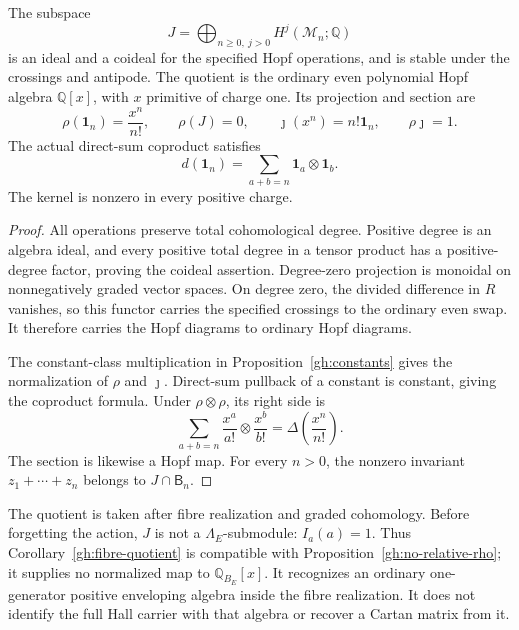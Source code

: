 \begin{corollary}\label{gh:fibre-quotient}
The subspace
\[
 J=\bigoplus_{n\geq0,\ j>0}H^j(\mathcal M_n;\mathbb Q)
\]
is an ideal and a coideal for the specified Hopf operations, and is
stable under the crossings and antipode. The quotient is the
ordinary even polynomial Hopf algebra $\mathbb Q[x]$, with $x$
primitive of charge one. Its projection and section are
\[
 \rho(\mathbf1_n)=\frac{x^n}{n!},\qquad
 \rho(J)=0,\qquad
 \jmath(x^n)=n!\mathbf1_n,\qquad \rho\jmath=1.
\]
The actual direct-sum coproduct satisfies
\[
 d(\mathbf1_n)=\sum_{a+b=n}\mathbf1_a\otimes\mathbf1_b.
\]
The kernel is nonzero in every positive charge.
\end{corollary}
\begin{proof}
All operations preserve total cohomological degree. Positive degree
is an algebra ideal, and every positive total degree in a tensor
product has a positive-degree factor, proving the coideal assertion.
Degree-zero projection is monoidal on nonnegatively graded vector
spaces. On degree zero, the divided difference in $R$ vanishes,
so this functor carries the specified crossings to the ordinary
even swap. It therefore carries the Hopf diagrams to ordinary
Hopf diagrams.

The constant-class multiplication in
Proposition~\ref{gh:constants} gives the normalization of $\rho$
and $\jmath$. Direct-sum pullback of a constant is constant, giving
the coproduct formula. Under $\rho\otimes\rho$, its right side is
\[
 \sum_{a+b=n}\frac{x^a}{a!}\otimes\frac{x^b}{b!}
 =\Delta\left(\frac{x^n}{n!}\right).
\]
The section is likewise a Hopf map.
For every $n>0$, the nonzero invariant
$z_1+\cdots+z_n$ belongs to $J\cap\mathsf B_n$.
\end{proof}

The quotient is taken after fibre realization and graded cohomology.
Before forgetting the action, $J$ is not a $\Lambda_E$-submodule:
$I_a(a)=1$. Thus Corollary~\ref{gh:fibre-quotient} is compatible
with Proposition~\ref{gh:no-relative-rho}; it supplies no
normalized map to $\mathbb Q_{B_E}[x]$.
It recognizes an ordinary one-generator positive enveloping algebra
inside the fibre realization. It does not identify the full Hall
carrier with that algebra or recover a Cartan matrix from it.

